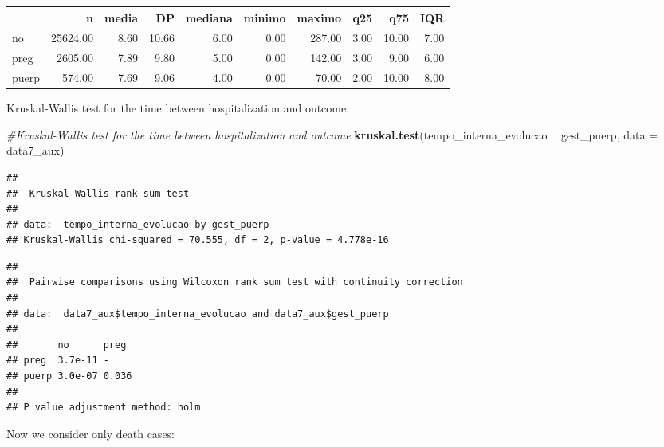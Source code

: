\documentclass[
]{article}
\newenvironment{Shaded}{\begin{snugshade}}{\end{snugshade}}
\newcommand{\CommentTok}[1]{\textcolor[rgb]{0.56,0.35,0.01}{\textit{#1}}}
\newcommand{\DataTypeTok}[1]{\textcolor[rgb]{0.13,0.29,0.53}{#1}}
\newcommand{\KeywordTok}[1]{\textcolor[rgb]{0.13,0.29,0.53}{\textbf{#1}}}
\newcommand{\NormalTok}[1]{#1}
\newcommand{\OperatorTok}[1]{\textcolor[rgb]{0.81,0.36,0.00}{\textbf{#1}}}
\newcommand{\StringTok}[1]{\textcolor[rgb]{0.31,0.60,0.02}{#1}}
\begin{document}
\begin{longtable}[]{@{}lrrrrrrrrr@{}}
\toprule
& n & media & DP & mediana & minimo & maximo & q25 & q75 &
IQR\tabularnewline
\midrule
\endhead
no & 25624.00 & 8.60 & 10.66 & 6.00 & 0.00 & 287.00 & 3.00 & 10.00 &
7.00\tabularnewline
preg & 2605.00 & 7.89 & 9.80 & 5.00 & 0.00 & 142.00 & 3.00 & 9.00 &
6.00\tabularnewline
puerp & 574.00 & 7.69 & 9.06 & 4.00 & 0.00 & 70.00 & 2.00 & 10.00 &
8.00\tabularnewline
\bottomrule
\end{longtable}

Kruskal-Wallis test for the time between hospitalization and outcome:

\begin{Shaded}
\begin{Highlighting}[]
\CommentTok{#Kruskal-Wallis test for the time between hospitalization and outcome}
\KeywordTok{kruskal.test}\NormalTok{(tempo_interna_evolucao }\OperatorTok{~}\StringTok{ }\NormalTok{gest_puerp,}
             \DataTypeTok{data =}\NormalTok{ data7_aux)}
\end{Highlighting}
\end{Shaded}

\begin{verbatim}
## 
##  Kruskal-Wallis rank sum test
## 
## data:  tempo_interna_evolucao by gest_puerp
## Kruskal-Wallis chi-squared = 70.555, df = 2, p-value = 4.778e-16
\end{verbatim}

\begin{Shaded}
\end{Shaded}

\begin{verbatim}
## 
##  Pairwise comparisons using Wilcoxon rank sum test with continuity correction 
## 
## data:  data7_aux$tempo_interna_evolucao and data7_aux$gest_puerp 
## 
##       no      preg 
## preg  3.7e-11 -    
## puerp 3.0e-07 0.036
## 
## P value adjustment method: holm
\end{verbatim}

Now we consider only death cases:
\end{document}
